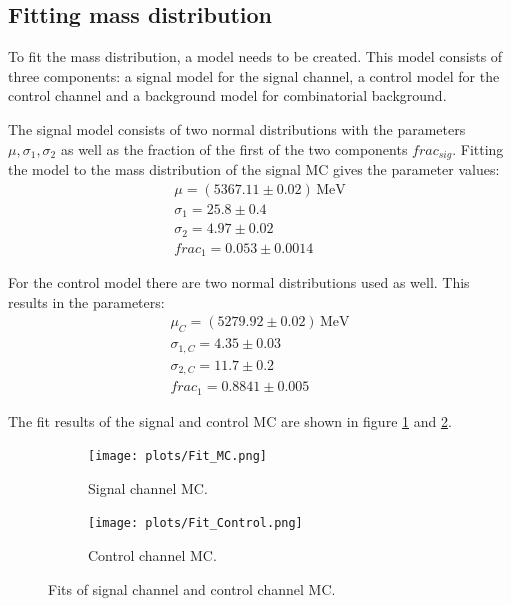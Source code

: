 \subsection{Fitting mass distribution}
To fit the mass distribution, a model needs to be created.
This model consists of three components: a signal model for the signal channel, a control model for the control channel and a background model for combinatorial background.

The signal model consists of two normal distributions with the parameters $\mu , \sigma_1, \sigma_2$ as well as the fraction of the first of the two components $frac_{sig}$.
Fitting the model to the mass distribution of the signal MC gives the parameter values:
\begin{align*}
  \mu = (5367.11 \pm 0.02)\,\text{MeV} \\
  \sigma_1 = 25.8 \pm 0.4 \\
  \sigma_2 = 4.97 \pm 0.02 \\
  frac_{1} = 0.053 \pm 0.0014
\end{align*}

For the control model there are two normal distributions used as well.
This results in the parameters:
\begin{align*}
  \mu_C = (5279.92 \pm 0.02)\,\text{MeV} \\
  \sigma_{1,C} = 4.35 \pm 0.03 \\
  \sigma_{2,C} = 11.7 \pm 0.2 \\
  frac_{1} = 0.8841 \pm 0.005
\end{align*}

The fit results of the signal and control MC are shown in figure \ref{fig:Fit_MC} and \ref{fig:Fit_Control}.

\begin{figure}
\centering
\begin{subfigure}{.5\textwidth}
  \centering
  \texttt{[image: plots/Fit\_MC.png]}
  \caption{Signal channel MC.}
  \label{fig:Fit_MC}
\end{subfigure}%
\begin{subfigure}{.5\textwidth}
  \centering
  \texttt{[image: plots/Fit\_Control.png]}
  \caption{Control channel MC.}
  \label{fig:Fit_Control}
\end{subfigure}
\caption{Fits of signal channel and control channel MC.}
\label{fig:Fit}
\end{figure}

